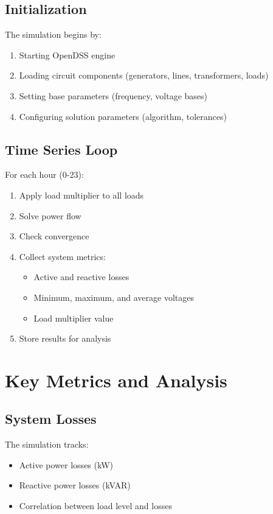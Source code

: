\documentclass[11pt]{article}
\begin{document}
\subsection{Initialization}
The simulation begins by:
\begin{enumerate}
    \item Starting OpenDSS engine
    \item Loading circuit components (generators, lines, transformers, loads)
    \item Setting base parameters (frequency, voltage bases)
    \item Configuring solution parameters (algorithm, tolerances)
\end{enumerate}

\subsection{Time Series Loop}
For each hour (0-23):
\begin{enumerate}
    \item Apply load multiplier to all loads
    \item Solve power flow
    \item Check convergence
    \item Collect system metrics:
        \begin{itemize}
            \item Active and reactive losses
            \item Minimum, maximum, and average voltages
            \item Load multiplier value
        \end{itemize}
    \item Store results for analysis
\end{enumerate}

\section{Key Metrics and Analysis}

\subsection{System Losses}
The simulation tracks:
\begin{itemize}
    \item Active power losses (kW)
    \item Reactive power losses (kVAR)
    \item Correlation between load level and losses
\end{itemize}
\end{document}
